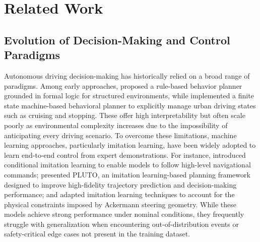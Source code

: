 \documentclass[sn-mathphys,Numbered]{sn-jnl}
\begin{document}
\section{Related Work}

\subsection{Evolution of Decision-Making and Control Paradigms}

Autonomous driving decision-making has historically relied on a broad range of paradigms. Among early approaches, \citet{bouchard2015rulebased} proposed a rule-based behavior planner grounded in formal logic for structured environments, while \citet{bae2020fsm} implemented a finite state machine-based behavioral planner to explicitly manage urban driving states such as cruising and stopping. These offer high interpretability but often scale poorly as environmental complexity increases due to the impossibility of anticipating every driving scenario. To overcome these limitations, machine learning approaches, particularly imitation learning, have been widely adopted to learn end-to-end control from expert demonstrations. For instance, \citet{codevilla2018il} introduced conditional imitation learning to enable models to follow high-level navigational commands; \citet{cheng2023pluto} presented PLUTO, an imitation learning-based planning framework designed to improve high-fidelity trajectory prediction and decision-making performance; and \citet{moncalvillo2024ackermann} adapted imitation learning techniques to account for the physical constraints imposed by Ackermann steering geometry. While these models achieve strong performance under nominal conditions, they frequently struggle with generalization when encountering out-of-distribution events or safety-critical edge cases not present in the training dataset.
\end{document}
